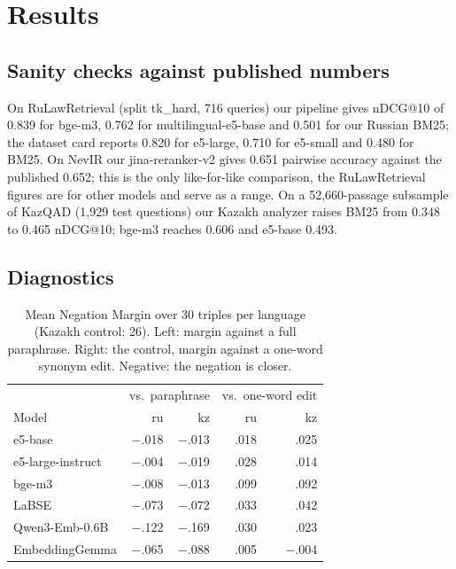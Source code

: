 \documentclass[11pt]{article}
\begin{document}
\section{Results}

\subsection{Sanity checks against published numbers}
On RuLawRetrieval \citep{rulawretrieval2026} (split tk\_hard, 716 queries) our pipeline gives nDCG@10 of 0.839 for bge-m3, 0.762 for
multilingual-e5-base and 0.501 for our Russian BM25; the dataset card reports 0.820 for e5-large, 0.710 for
e5-small and 0.480 for BM25. On NevIR our jina-reranker-v2 gives 0.651 pairwise accuracy against the
published 0.652; this is the only like-for-like comparison, the RuLawRetrieval figures are for other models
and serve as a range. On a 52,660-passage subsample of KazQAD \citep{yeshpanov-etal-2024-kazqad} (1,929 test questions) our Kazakh analyzer raises
BM25 from 0.348 to 0.465 nDCG@10; bge-m3 reaches 0.606 and e5-base 0.493.

\subsection{Diagnostics}

\begin{table}[t]
\centering\small\setlength{\tabcolsep}{4pt}
\begin{tabular}{lrrrr}
\toprule
& \multicolumn{2}{c}{vs.\ paraphrase} & \multicolumn{2}{c}{vs.\ one-word edit} \\
Model & ru & kz & ru & kz \\
\midrule
e5-base & $-$.018 & $-$.013 & .018 & .025 \\
e5-large-instruct & $-$.004 & $-$.019 & .028 & .014 \\
bge-m3 & $-$.008 & $-$.013 & .099 & .092 \\
LaBSE & $-$.073 & $-$.072 & .033 & .042 \\
Qwen3-Emb-0.6B & $-$.122 & $-$.169 & .030 & .023 \\
EmbeddingGemma & $-$.065 & $-$.088 & .005 & $-$.004 \\
\bottomrule
\end{tabular}
\caption{Mean Negation Margin over 30 triples per language (Kazakh control: 26). Left: margin against a full
paraphrase. Right: the control, margin against a one-word synonym edit. Negative: the negation is closer.}
\label{tab:d1}
\end{table}
\end{document}
